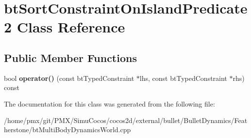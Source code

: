 \hypertarget{classbtSortConstraintOnIslandPredicate2}{}\section{bt\+Sort\+Constraint\+On\+Island\+Predicate2 Class Reference}
\label{classbtSortConstraintOnIslandPredicate2}
\subsection*{Public Member Functions}
\begin{DoxyCompactItemize}
\item 
\mbox{\label{classbtSortConstraintOnIslandPredicate2_ad216b9467650c96048141e48a4a02dcf}} 
bool {\bfseries operator()} (const bt\+Typed\+Constraint $\ast$lhs, const bt\+Typed\+Constraint $\ast$rhs) const
\end{DoxyCompactItemize}


The documentation for this class was generated from the following file\+:\begin{DoxyCompactItemize}
\item 
/home/pmx/git/\+P\+M\+X/\+Simu\+Cocos/cocos2d/external/bullet/\+Bullet\+Dynamics/\+Featherstone/bt\+Multi\+Body\+Dynamics\+World.\+cpp\end{DoxyCompactItemize}
